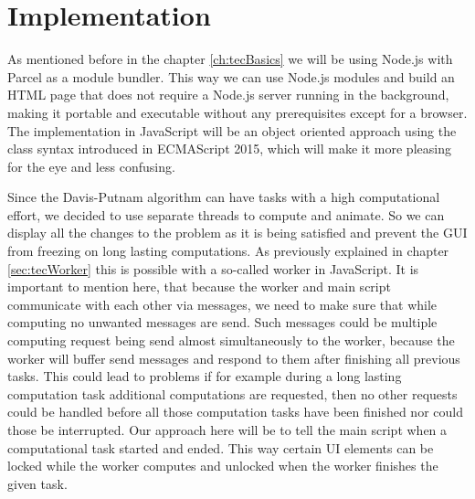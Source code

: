
\chapter{Implementation}
\label{ch:implementation}
As mentioned before in the chapter \ref{ch:tecBasics} we will be using Node.js with Parcel as a module bundler. This way we can use Node.js modules and build an HTML page that does not require a Node.js server running in the background, making it portable and executable without any prerequisites except for a browser. The implementation in JavaScript will be an object oriented approach using the class syntax introduced in ECMAScript 2015, which will make it more pleasing for the eye and less confusing.

Since the Davis-Putnam algorithm can have tasks with a high computational effort, we decided to use separate threads to compute and animate. So we can display all the changes to the problem as it is being satisfied and prevent the GUI from freezing on long lasting computations. As previously explained in chapter \ref{sec:tecWorker} this is possible with a so-called worker in JavaScript. It is important to mention here, that because the worker and main script communicate with each other via messages, we need to make sure that while computing no unwanted messages are send. Such messages could be multiple computing request being send almost simultaneously to the worker, because the worker will buffer send messages and respond to them after finishing all previous tasks. This could lead to problems if for example during a long lasting computation task additional computations are requested, then no other requests could be handled before all those computation tasks have been finished nor could those be interrupted. Our approach here will be to tell the main script when a computational task started and ended. This way certain UI elements can be locked while the worker computes and unlocked when the worker finishes the given task.

